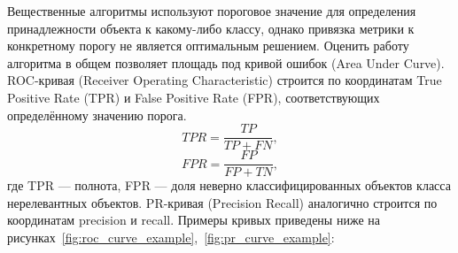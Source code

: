 Вещественные алгоритмы используют пороговое значение для определения принадлежности объекта к какому-либо классу, однако привязка метрики к конкретному порогу не является оптимальным решением.
Оценить работу алгоритма в общем позволяет площадь под кривой ошибок (Area Under Curve).
ROC-кривая (Receiver Operating Characteristic) строится по координатам True Positive Rate (TPR) и False Positive Rate (FPR), соответствующих определённому значению порога.
\begin{equation}\label{eq:tpr}
TPR = \frac{TP}{TP + FN},
\end{equation}
\begin{equation}\label{eq:fpr}
FPR = \frac{FP}{FP + TN},
\end{equation}
где TPR --- полнота, FPR --- доля неверно классифицированных объектов класса нерелевантных объектов.
PR-кривая (Precision Recall) аналогично строится по координатам precision и recall.
Примеры кривых приведены ниже на рисунках~\ref{fig:roc_curve_example},~\ref{fig:pr_curve_example}:
